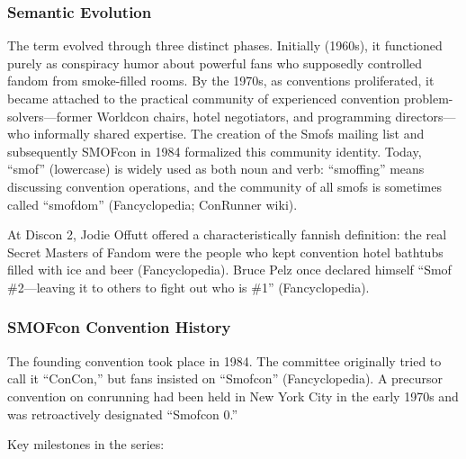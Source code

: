 \documentclass[11pt,letterpaper]{article}
\begin{document}
\subsubsection{Semantic Evolution}

The term evolved through three distinct phases. Initially (1960s), it functioned purely as conspiracy humor about powerful fans who supposedly controlled fandom from smoke-filled rooms. By the 1970s, as conventions proliferated, it became attached to the practical community of experienced convention problem-solvers---former Worldcon chairs, hotel negotiators, and programming directors---who informally shared expertise. The creation of the Smofs mailing list and subsequently SMOFcon in 1984 formalized this community identity. Today, ``smof'' (lowercase) is widely used as both noun and verb: ``smoffing'' means discussing convention operations, and the community of all smofs is sometimes called ``smofdom'' (Fancyclopedia; ConRunner wiki).

At Discon 2, Jodie Offutt offered a characteristically fannish definition: the real Secret Masters of Fandom were the people who kept convention hotel bathtubs filled with ice and beer (Fancyclopedia). Bruce Pelz once declared himself ``Smof \#2---leaving it to others to fight out who is \#1'' (Fancyclopedia).

\subsubsection{SMOFcon Convention History}

The founding convention took place in 1984. The committee originally tried to call it ``ConCon,'' but fans insisted on ``Smofcon'' (Fancyclopedia). A precursor convention on conrunning had been held in New York City in the early 1970s and was retroactively designated ``Smofcon 0.''

Key milestones in the series:
\end{document}
